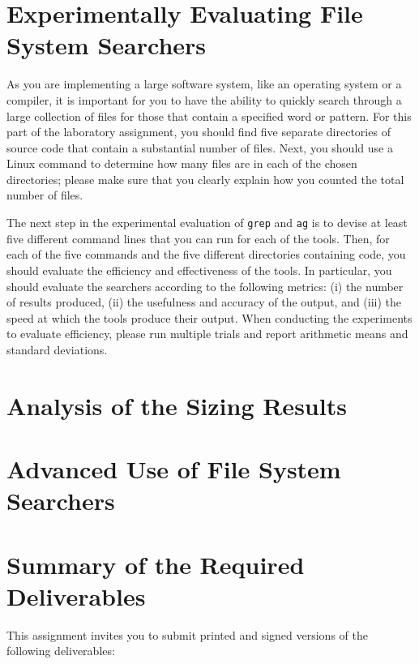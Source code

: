 \section*{Experimentally Evaluating File System Searchers}

As you are implementing a large software system, like an operating system or a compiler, it is important for you to have
the ability to quickly search through a large collection of files for those that contain a specified word or pattern.
For this part of the laboratory assignment, you should find five separate directories of source code that contain a
substantial number of files. Next, you should use a Linux command to determine how many files are in each of the chosen
directories; please make sure that you clearly explain how you counted the total number of files.

The next step in the experimental evaluation of {\tt grep} and {\tt ag} is to devise at least five different command
lines that you can run for each of the tools. Then, for each of the five commands and the five different directories
containing code, you should evaluate the efficiency and effectiveness of the tools. In particular, you should evaluate
the searchers according to the following metrics: (i) the number of results produced, (ii) the usefulness and accuracy
of the output, and (iii) the speed at which the tools produce their output. When conducting the experiments to evaluate
efficiency, please run multiple trials and report arithmetic means and standard deviations. 

\section*{Analysis of the Sizing Results}

\section*{Advanced Use of File System Searchers}

\section*{Summary of the Required Deliverables}

This assignment invites you to submit printed and signed versions of the following deliverables: 

